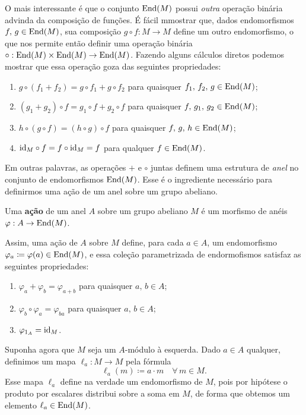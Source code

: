 O mais interessante é que o conjunto $\mathrm{End}(M)$ possui \emph{outra} operação binária advinda da composição de funções.
É fácil mmostrar que, dados endomorfismos $f,\,g \in \mathrm{End}(M)$, sua composição $g \circ f: M \to M$ define um outro endomorfismo, o que nos permite então definir uma operação binária $\circ: \mathrm{End}(M) \times \mathrm{End}(M) \to \mathrm{End}(M)$.
Fazendo alguns cálculos diretos podemos mostrar que essa operação goza das seguintes propriedades:
\begin{enumerate}
\item $g \circ (f_1 + f_2) = g \circ f_1 + g \circ f_2$ para quaisquer $f_1,\,f_2,\, g \in \mathrm{End}(M)$;
  
\item $(g_1 + g_2) \circ f = g_1 \circ f + g_2 \circ f$ para quaisquer $f,\, g_1,\, g_2 \in \mathrm{End}(M)$;
  
\item $h \circ (g \circ f) = (h \circ g) \circ f$ para quaisquer $f,\,g,\, h \in \mathrm{End}(M)$;
  
\item $\mathrm{id}_M \circ f = f \circ \mathrm{id}_M = f$ para qualquer $f \in \mathrm{End}(M)$.
\end{enumerate}

Em outras palavras, as operações $+$ e $\circ$ juntas definem uma estrutura de \emph{anel} no conjunto de endomorfismos $\mathrm{End}(M)$.
Esse é o ingrediente necessário para definirmos uma ação de um anel sobre um grupo abeliano.

\begin{defin}
  Uma \textbf{ação} de um anel $A$ sobre um grupo abeliano $M$ é um morfismo de anéis $\varphi: A \to \mathrm{End}(M)$.
\end{defin}

Assim, uma ação de $A$ sobre $M$ define, para cada $a \in A$, um endomorfismo $\varphi_a \coloneqq \varphi(a) \in \mathrm{End}(M)$, e essa coleção parametrizada de endormofismos satisfaz as seguintes propriedades:
\begin{enumerate}
\item $\varphi_a + \varphi_b = \varphi_{a+b}$ para quaisquer $a,\,b \in A$;
  
\item $\varphi_b \circ \varphi_a = \varphi_{ba}$ para quaisquer $a,\,b \in A$;
  
\item $\varphi_{1_A} = \mathrm{id}_M$.
\end{enumerate}

Suponha agora que $M$ seja um $A$-módulo à esquerda.
Dado $a \in A$ qualquer, definimos um mapa $\ell_a: M \to M$ pela fórmula
\begin{displaymath}
  \ell_a(m) \coloneqq a \cdot m \quad \forall\, m \in M.
\end{displaymath}
Esse mapa $\ell_a$ define na verdade um endomorfismo de $M$, pois por hipótese o produto por escalares distribui sobre a soma em $M$, de forma que obtemos um elemento $\ell_a \in \mathrm{End}(M)$.

